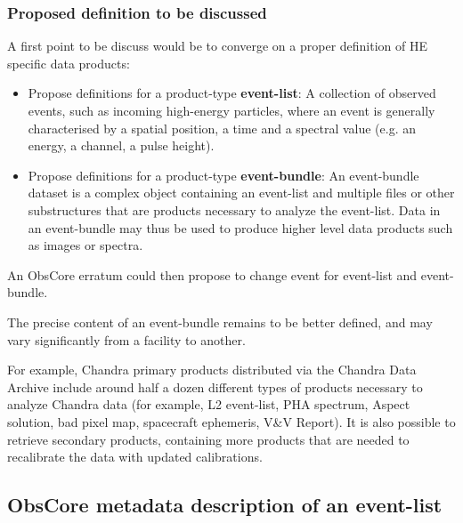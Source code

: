 \documentclass[11pt,a4paper]{ivoa}
\begin{document}
\subsubsection{Proposed definition to be discussed}

A first point to be discuss would be to converge on a proper definition of HE specific data products:
\begin{itemize}
    \item Propose definitions for a product-type \textbf{event-list}: A collection of observed events, such as incoming high-energy particles, where an event is generally characterised by a spatial position, a time and a spectral value (e.g. an energy, a channel, a pulse height).
    \item Propose definitions for a product-type \textbf{event-bundle}: An event-bundle dataset is a complex object containing an event-list and multiple files or other substructures that are products necessary to analyze the event-list. Data in an event-bundle may thus be used to produce higher level data products such as images or spectra.
\end{itemize}

An ObsCore erratum could then propose to change event for event-list and event-bundle.

The precise content of an event-bundle remains to be better defined, and may vary significantly from a facility to another.

For example, Chandra primary products distributed via the Chandra Data Archive include around half a dozen different types of products necessary to analyze Chandra data (for example, L2 event-list, PHA spectrum, Aspect solution, bad pixel map, spacecraft ephemeris, V\&V Report). It is also possible to retrieve secondary products, containing more products that are needed to recalibrate the data with updated calibrations.


\subsection{ObsCore metadata description of an event-list}
\label{sec:obscore}

%

\end{document}
